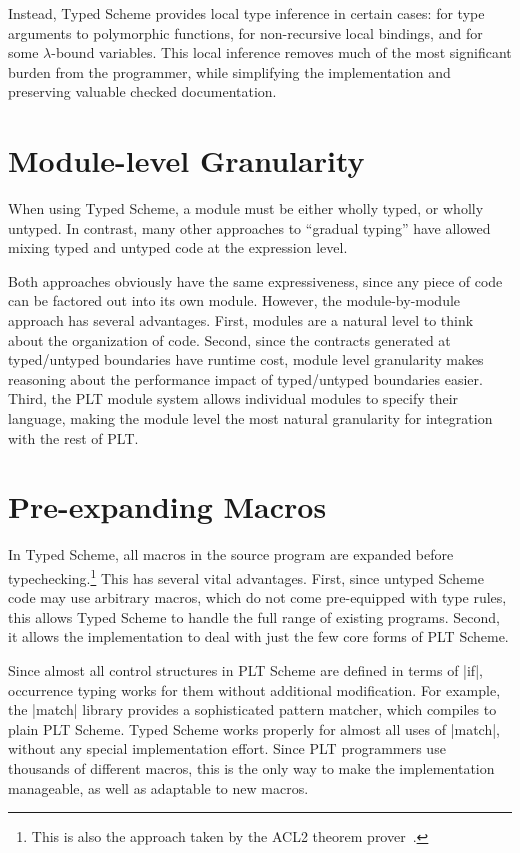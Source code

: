 \begin{schemeregion}
Instead, Typed Scheme provides local type inference in certain cases:
for type arguments to polymorphic functions, for non-recursive local
bindings, and for some $\lambda$-bound variables.  This local
inference removes much of the most significant burden from the
programmer, while simplifying the implementation and preserving
valuable checked documentation.

\section{Module-level Granularity}

When using Typed Scheme, a module must be either wholly typed, or
wholly untyped.  In contrast, many other approaches to ``gradual
typing'' have allowed mixing typed and untyped code at the expression
level.  

Both approaches obviously have the same expressiveness, since
any piece of code can be factored out into its own module.  However,
the module-by-module approach has several advantages.  First, modules
are a natural level to think about the organization of code.  Second, 
since the contracts generated at typed/untyped boundaries have runtime
cost, module level granularity makes reasoning about the performance
impact of typed/untyped boundaries easier.  Third, the PLT module
system allows individual modules to specify their language, making the
module level the most natural granularity for integration with the
rest of PLT.  

\section{Pre-expanding Macros}

In Typed Scheme, all macros in the source program are expanded before
typechecking.\footnote{This is also the approach taken by the ACL2
  theorem prover~\cite{acl2-book}.}  This has several vital
advantages.
  First, since untyped Scheme code
may use arbitrary macros, which do not come pre-equipped with type
rules, this allows Typed Scheme to handle the full range of existing
programs.  Second, it allows the implementation to deal with just the few
core forms of PLT Scheme.  

Since almost all control structures in PLT Scheme are defined in terms
of \scheme|if|, occurrence typing  works for them without
additional modification.  For example, the \scheme|match| library
provides a sophisticated pattern matcher, which compiles to plain PLT
Scheme.  Typed Scheme works properly for almost all uses of
\scheme|match|, without any special implementation effort. Since PLT
programmers use thousands of different macros, this is the only way to
make the implementation manageable, as well as adaptable to new
macros. 


\end{schemeregion}
